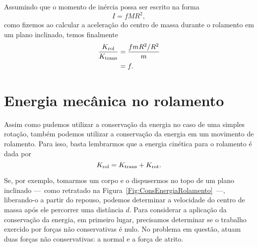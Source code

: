 Assumindo que o momento de inércia possa ser escrito na forma
\begin{equation}
    I = f MR^2,
\end{equation}
%
como fizemos ao calcular a aceleração do centro de massa durante o rolamento em um plano inclinado, temos finalmente
\begin{align}
    \frac{K_{\rm{rol}}}{K_{\rm{trans}}} &= \frac{f mR^2 /R^2}{m} \\
    &= f.
\end{align}

\section{Energia mecânica no rolamento}


Assim como pudemos utilizar a conservação da energia no caso de uma simples rotação, também podemos utilizar a conservação da energia em um movimento de rolamento. Para isso, basta lembrarmos que a energia cinética para o rolamento é dada por
\begin{equation}
    K_{\rm{rol}} = K_{\rm{trans}} + K_{\rm{rot}}.
\end{equation}

Se, por exemplo, tomarmos um corpo e o dispusermos no topo de um plano inclinado ---~como retratado na Figura~\ref{Fig:ConsEnergiaRolamento}~---, liberando-o a partir do repouso, podemos determinar a velocidade do centro de massa após ele percorrer uma distância $d$. Para considerar a aplicação da conservação da energia, em primeiro lugar, precisamos determinar se o trabalho exercido por forças não conservativas é nulo. No problema em questão, atuam duas forças não conservativas: a normal e a força de atrito.

